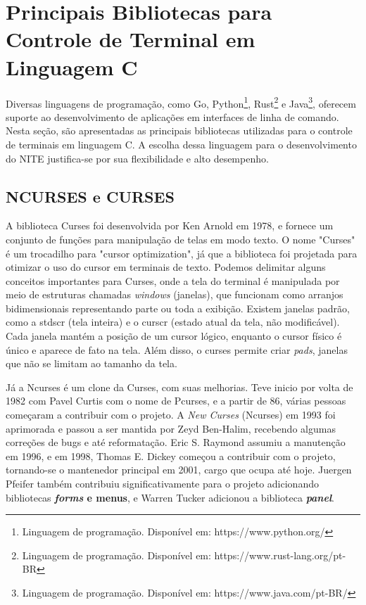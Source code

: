 \section{Principais Bibliotecas para Controle de Terminal em Linguagem C}

Diversas linguagens de programação, como Go, Python\footnote{Linguagem de
programação. Disponível em: https://www.python.org/}, Rust\footnote{Linguagem de
programação. Disponível em: https://www.rust-lang.org/pt-BR} e Java\footnote{Linguagem
de programação. Disponível em: https://www.java.com/pt-BR/}, oferecem suporte ao
desenvolvimento de aplicações em interfaces de linha de comando. Nesta seção,
são apresentadas as principais bibliotecas utilizadas para o controle de
terminais em linguagem C. A escolha dessa linguagem para o desenvolvimento do NITE
justifica-se por sua flexibilidade e alto desempenho.

\subsection{NCURSES e CURSES}

A biblioteca Curses foi desenvolvida por Ken Arnold em 1978, e fornece um conjunto
de funções para manipulação de telas em modo texto. O nome "Curses" é um
trocadilho para "cursor optimization", já que a biblioteca foi projetada para otimizar
o uso do cursor em terminais de texto. Podemos delimitar alguns conceitos
importantes para Curses, onde a tela do terminal é manipulada por meio de estruturas
chamadas \textit{windows} (janelas), que funcionam como arranjos bidimensionais representando
parte ou toda a exibição. Existem janelas padrão, como a stdscr (tela inteira) e
o curscr (estado atual da tela, não modificável). Cada janela mantém a posição de
um cursor lógico, enquanto o cursor físico é único e aparece de fato na tela. Além
disso, o curses permite criar \textit{pads}, janelas que não se limitam ao
tamanho da tela. \cite{ibm_curses_aix}

Já a Ncurses é um clone da Curses, com suas melhorias. Teve inicio por volta de
1982 com Pavel Curtis com o nome de Pcurses, e a partir de 86, várias pessoas
começaram a contribuir com o projeto. A \textit{New Curses} (Ncurses) em 1993
foi aprimorada e passou a ser mantida por Zeyd Ben-Halim, recebendo algumas correções
de bugs e até reformatação. Eric S. Raymond assumiu a manutenção em 1996, e em
1998, Thomas E. Dickey começou a contribuir com o projeto, tornando-se o mantenedor
principal em 2001, cargo que ocupa até hoje. Juergen Pfeifer também contribuiu significativamente
para o projeto adicionando bibliotecas \textbf{\textit{forms} e menus}, e Warren
Tucker adicionou a biblioteca \textbf{\textit{panel}}. \cite{ncurses_site}

